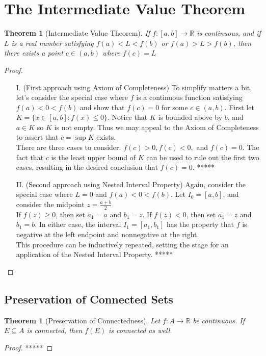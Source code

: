 \documentclass[10pt]{report}
\newtheorem{thm2}{Theorem}[section]
\newtheorem{thm3}{Theorem}[subsection]
\begin{document}
\section{The Intermediate Value Theorem}
\begin{thm2}[Intermediate Value Theorem]
If $f:[a,b]\to\mathbb{R}$ is continuous, and if $L$ is a real number satisfying $f(a)<L<f(b)$ or $f(a)>L>f(b)$, then there exists a point $c\in(a,b)$ where $f(c)=L$
\end{thm2}
\begin{proof}
\begin{itemize}
\item[I.](First approach using Axiom of Completeness) To simplify matters a bit, let's consider the special case where $f$ is a continuous function satisfying $f(a) < 0 < f(b)$ and show that $f(c)=0$ for some $c\in(a,b)$. First let $K=\{x\in[a,b]:f(x)\leq 0\}$. Notice that $K$ is bounded above by $b$, and $a\in K$ so $K$ is not empty. Thus we may appeal to the Axiom of Completeness to assert that $c=\sup K$ exists.\\
There are three cases to consider: $f(c)>0, f(c)<0,$ and $f(c)=0$. The fact that $c$ is the least upper bound of $K$ can be used to rule out the first two cases, resulting in the desired conclusion that $f(c)=0$. *****
\item[II.](Second approach using Nested Interval Property) Again, consider the special case where $L=0$ and $f(a)<0<f(b)$. Let $I_0=[a,b]$, and consider the midpoint $z=\frac{a+b}{2}$\\
If $f(z)\geq 0$, then set $a_1=a$ and $b_1=z$. If $f(z)<0$, then set $a_1=z$ and $b_1 = b$. In either case, the interval $I_1=[a_1,b_1]$ has the property that $f$ is negative at the left endpoint and nonnegative at the right.\\
This procedure can be inductively repeated, setting the stage for an application of the Nested Interval Property. *****
\end{itemize}
\end{proof}
\subsection{Preservation of Connected Sets}
\begin{thm3}[Preservation of Connectedness]
Let $f:A\to\mathbb{R}$ be continuous. If $E\subseteq A$ is connected, then $f(E)$ is connected as well.
\end{thm3}
\begin{proof}
*****
\end{proof}
\end{document}
